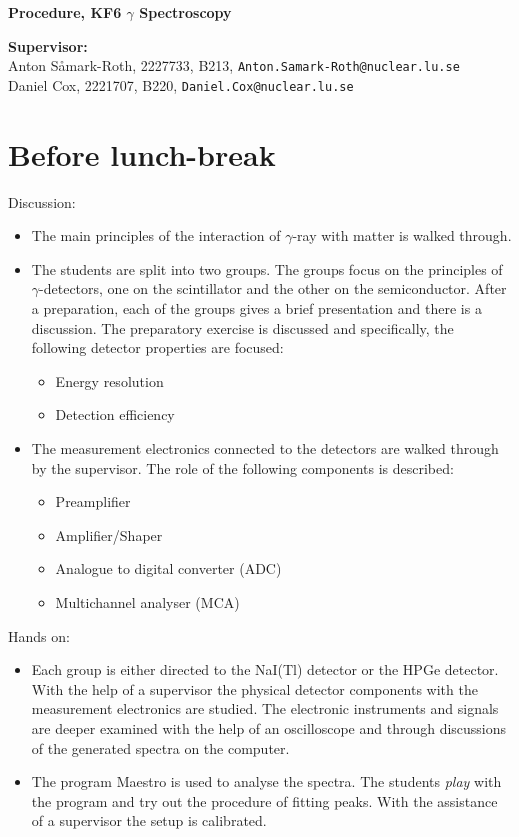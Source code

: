 \documentclass[12pt]{article}
\begin{document}
\begin{center} {\Large\bf\boldmath Procedure, KF6 $\gamma$ Spectroscopy}\\
\end{center}

{\bf Supervisor:}\\
Anton S\r{a}mark-Roth,     2227733, B213, \texttt{Anton.Samark-Roth@nuclear.lu.se}\\
Daniel Cox, 2221707, B220, \texttt{Daniel.Cox@nuclear.lu.se}\\

\section*{Before lunch-break}
Discussion:
\begin{itemize}
  \item The main principles of the interaction of $\gamma$-ray with matter is walked through.
  \item The students are split into two groups. The groups focus on the principles of $\gamma$-detectors, one on the scintillator and the other on the semiconductor. After a preparation, each of the groups gives a brief presentation and there is a discussion. The preparatory exercise is discussed and specifically, the following detector properties are focused:
    \begin{itemize}
      \item Energy resolution
      \item Detection efficiency
    \end{itemize}
  \item The measurement electronics connected to the detectors are walked through by the supervisor. The role of the following components is described:
  \begin{itemize}
    \item Preamplifier
    \item Amplifier/Shaper
    \item Analogue to digital converter (ADC)
    \item Multichannel analyser (MCA)
  \end{itemize}
\end{itemize}

Hands on:
\begin{itemize}
  \item Each group is either directed to the NaI(Tl) detector or the HPGe detector. With the help of a supervisor the physical detector components with the measurement electronics are studied. The electronic instruments and signals are deeper examined with the help of an oscilloscope and through discussions of the generated spectra on the computer.
  \item The program Maestro is used to analyse the spectra. The students \textit{play} with the program and try out the procedure of fitting peaks. With the assistance of a supervisor the setup is calibrated.
\end{itemize}
\end{document}
